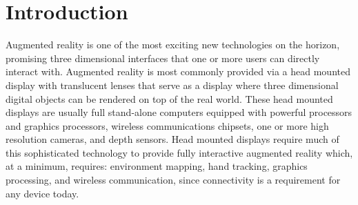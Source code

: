 \documentclass[12pt,dvips]{report}
\begin{document}
\pagebreak


\tableofcontents
\pagebreak

\listoffigures
\pagebreak

\listoftables
\pagebreak

\pagestyle{myheadings}

\chapter{Introduction}
Augmented reality is one of the most exciting new technologies on the horizon, promising three dimensional interfaces that one or more users can directly interact with. Augmented reality is most commonly provided via a head mounted display with translucent lenses that serve as a display where three dimensional digital objects can be rendered on top of the real world. These head mounted displays are usually full stand-alone computers equipped with powerful processors and graphics processors, wireless communications chipsets, one or more high resolution cameras, and depth sensors. Head mounted displays require much of this sophisticated technology to provide fully interactive augmented reality which, at a minimum, requires: environment mapping, hand tracking, graphics processing, and wireless communication, since connectivity is a requirement for any device today. 
\end{document}
